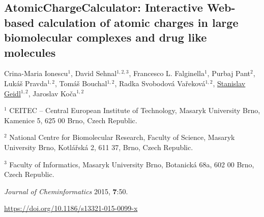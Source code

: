 \begin{center}
\section{\centering AtomicChargeCalculator: Interactive Web-based calculation
of atomic charges in large biomolecular complexes and drug like molecules}

Crina-Maria Ionescu$^1$, David Sehnal$^{1, 2, 3}$, Francesco L. Falginella$^1$,
Purbaj Pant$^2$, Lukáš Pravda$^{1, 2}$, Tomáš Bouchal$^{1, 2}$,
Radka Svobodová Vařeková$^{1, 2}$, \underline{Stanislav Geidl}$^{1, 2}$,
Jaroslav Koča$^{1, 2}$

\vspace{1cm}

$^1$ CEITEC -- Central European Institute of Technology,
Masaryk University Brno, Kamenice 5, 625 00 Brno, Czech Republic.

$^2$ National Centre for Biomolecular Research, Faculty of Science,
Masaryk University Brno, Kotlářská 2, 611 37, Brno, Czech Republic.

$^3$ Faculty of Informatics, Masaryk University Brno, Botanická 68a, 602 00 Brno,
Czech Republic.

\vspace{1cm}

\textit{Journal of Cheminformatics} 2015, \textbf{7}:50.

\vspace{1cm}

\url{https://doi.org/10.1186/s13321-015-0099-x}

\end{center}



